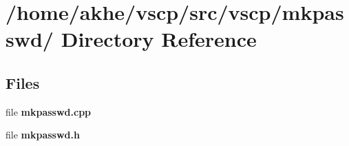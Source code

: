 \section{/home/akhe/vscp/src/vscp/mkpasswd/ Directory Reference}
\label{dir_1116819004417b018726e447d296d75f}
\subsection*{Files}
\begin{CompactItemize}
\item 
file \textbf{mkpasswd.cpp}
\item 
file \textbf{mkpasswd.h}
\end{CompactItemize}
